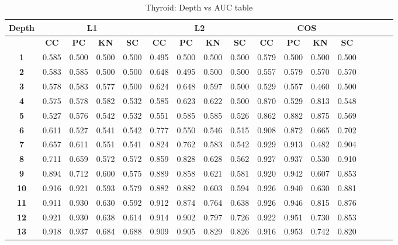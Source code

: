 \begin{table*}[!t]
\caption{Thyroid: Depth vs AUC table}
\label{comparisons:thyroid}
\centering
\begin{tabular}{|c|c|c|c|c|c|c|c|c|c|c|c|c|c|c|c|c|}
\hline
\bfseries Depth & \multicolumn{4}{c|}{\textbf{L1}} & \multicolumn{4}{c|}{\textbf{L2}} & \multicolumn{4}{c|}{\textbf{COS}} \\
\hline
\bfseries  & \bfseries CC & \bfseries PC & \bfseries KN & \bfseries SC & \bfseries CC & \bfseries PC & \bfseries KN & \bfseries SC & \bfseries CC & \bfseries PC & \bfseries KN & \bfseries SC \\
\hline
\bfseries 1 & 0.585 & 0.500 & 0.500 & 0.500 & 0.495 & 0.500 & 0.500 & 0.500 & 0.579 & 0.500 & 0.500 & 0.500 \\
\hline
\bfseries 2 & 0.583 & 0.585 & 0.500 & 0.500 & 0.648 & 0.495 & 0.500 & 0.500 & 0.557 & 0.579 & 0.570 & 0.570 \\
\hline
\bfseries 3 & 0.578 & 0.583 & 0.577 & 0.500 & 0.624 & 0.648 & 0.597 & 0.500 & 0.529 & 0.557 & 0.460 & 0.500 \\
\hline
\bfseries 4 & 0.575 & 0.578 & 0.582 & 0.532 & 0.585 & 0.623 & 0.622 & 0.500 & 0.870 & 0.529 & 0.813 & 0.548 \\
\hline
\bfseries 5 & 0.527 & 0.576 & 0.542 & 0.532 & 0.551 & 0.585 & 0.585 & 0.526 & 0.862 & 0.882 & 0.875 & 0.569 \\
\hline
\bfseries 6 & 0.611 & 0.527 & 0.541 & 0.542 & 0.777 & 0.550 & 0.546 & 0.515 & 0.908 & 0.872 & 0.665 & 0.702 \\
\hline
\bfseries 7 & 0.657 & 0.611 & 0.551 & 0.541 & 0.824 & 0.762 & 0.583 & 0.542 & 0.929 & 0.913 & 0.482 & 0.904 \\
\hline
\bfseries 8 & 0.711 & 0.659 & 0.572 & 0.572 & 0.859 & 0.828 & 0.628 & 0.562 & 0.927 & 0.937 & 0.530 & 0.910 \\
\hline
\bfseries 9 & 0.894 & 0.712 & 0.600 & 0.575 & 0.889 & 0.858 & 0.621 & 0.581 & 0.920 & 0.942 & 0.607 & 0.853 \\
\hline
\bfseries 10 & 0.916 & 0.921 & 0.593 & 0.579 & 0.882 & 0.882 & 0.603 & 0.594 & 0.926 & 0.940 & 0.630 & 0.881 \\
\hline
\bfseries 11 & 0.911 & 0.930 & 0.630 & 0.592 & 0.912 & 0.874 & 0.764 & 0.638 & 0.926 & 0.946 & 0.815 & 0.876 \\
\hline
\bfseries 12 & 0.921 & 0.930 & 0.638 & 0.614 & 0.914 & 0.902 & 0.797 & 0.726 & 0.922 & 0.951 & 0.730 & 0.853 \\
\hline
\bfseries 13 & 0.918 & 0.937 & 0.684 & 0.688 & 0.909 & 0.905 & 0.829 & 0.826 & 0.916 & 0.953 & 0.742 & 0.820 \\

\end{tabular}
\end{table*}
